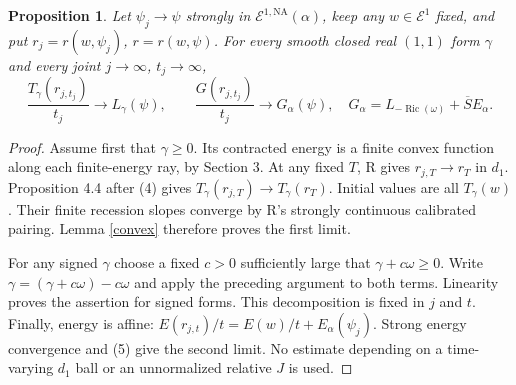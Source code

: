 \documentclass[11pt]{article}
\newtheorem{proposition}[theorem]{Proposition}
\newcommand{\Ric}{\operatorname{Ric}}
\newcommand{\NA}{\mathrm{NA}}
\begin{document}
\begin{proposition}\label{cohomological}
Let $\psi_j\to\psi$ strongly in $\mathcal E^{1,\NA}(\alpha)$,
keep any $w\in\mathcal E^1$ fixed, and put
$r_j=r(w,\psi_j)$, $r=r(w,\psi)$.
For every smooth closed real $(1,1)$ form $\gamma$ and every joint
$j\to\infty$, $t_j\to\infty$,
\[
 \frac{T_\gamma(r_{j,t_j})}{t_j}\longrightarrow L_\gamma(\psi),
 \qquad
 \frac{G(r_{j,t_j})}{t_j}\longrightarrow G_\alpha(\psi),\quad
 G_\alpha=L_{-\Ric(\omega)}+\overline S E_\alpha.      \tag{8}
\]
\end{proposition}
\begin{proof}
Assume first that $\gamma\ge0$. Its contracted energy is a finite
convex function along each finite-energy ray, by Section 3.
At any fixed $T$, R gives $r_{j,T}\to r_T$ in $d_1$.
Proposition 4.4 after (4) gives
$T_\gamma(r_{j,T})\to T_\gamma(r_T)$.
Initial values are all $T_\gamma(w)$. Their finite recession
slopes converge by R's strongly continuous calibrated pairing.
Lemma \ref{convex} therefore proves the first limit.

For any signed $\gamma$ choose a fixed $c>0$ sufficiently large
that $\gamma+c\omega\ge0$. Write
$\gamma=(\gamma+c\omega)-c\omega$ and apply the preceding
argument to both terms. Linearity proves the assertion for
signed forms. This decomposition is fixed in $j$ and $t$.
Finally, energy is affine:
$E(r_{j,t})/t=E(w)/t+E_\alpha(\psi_j)$.
Strong energy convergence and (5) give the second limit.
No estimate depending on a time-varying $d_1$ ball or an unnormalized
relative $J$ is used.
\end{proof}
\end{document}
